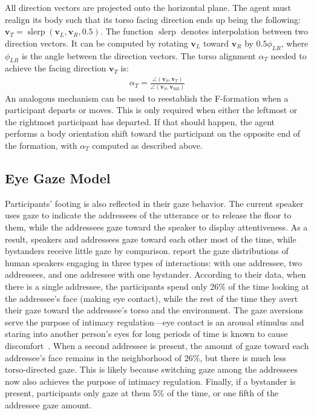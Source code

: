 All direction vectors are projected onto the horizontal plane. The agent must realign its body such that its torso facing direction ends up being the following: $\mathbf{v}_T = \mathop{slerp}(\mathbf{v}_L, \mathbf{v}_R, 0.5)$. The function $\mathop{slerp}$ denotes interpolation between two direction vectors. It can be computed by rotating $\mathbf{v}_L$ toward $\mathbf{v}_R$ by $0.5 \phi_{LR}$, where $\phi_{LR}$ is the angle between the direction vectors. The torso alignment $\alpha_T$ needed to achieve the facing direction $\mathbf{v}_T$ is:
%
\begin{align} \label{eq:FTorsoAlign}
\alpha_T = \frac{\angle(\mathbf{v}_S, \mathbf{v}_T)}{\angle(\mathbf{v}_S, \mathbf{v}_\mathrm{full})}
\end{align}
%
An analogous mechanism can be used to reestablish the F-formation when a participant departs or moves. This is only required when either the leftmost or the rightmost participant has departed. If that should happen, the agent performs a body orientation shift toward the participant on the opposite end of the formation, with $\alpha_T$ computed as described above.

\subsection{Eye Gaze Model}

Participants' footing is also reflected in their gaze behavior. The current speaker uses gaze to indicate the addressees of the utterance or to release the floor to them, while the addressees gaze toward the speaker to display attentiveness. As a result, speakers and addressees gaze toward each other most of the time, while bystanders receive little gaze by comparison. \citet{mutlu2012conversational} report the gaze distributions of human speakers engaging in three types of interactions: with one addressee, two addressees, and one addressee with one bystander. According to their data, when there is a single addressee, the participants spend only 26\% of the time looking at the addressee's face (making eye contact), while the rest of the time they avert their gaze toward the addressee's torso and the environment. The gaze aversions serve the purpose of intimacy regulation---eye contact is an arousal stimulus and staring into another person's eyes for long periods of time is known to cause discomfort~\citep{argyle1976gaze}. When a second addressee is present, the amount of gaze toward each addressee's face remains in the neighborhood of 26\%, but there is much less torso-directed gaze. This is likely because switching gaze among the addressees now also achieves the purpose of intimacy regulation. Finally, if a bystander is present, participants only gaze at them 5\% of the time, or one fifth of the addressee gaze amount.

